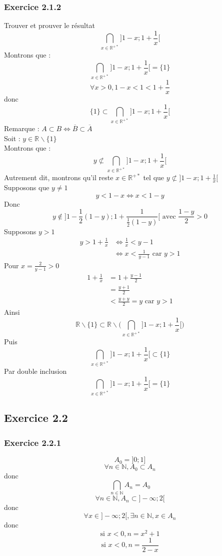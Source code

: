 \documentclass[a4paper,12pt]{article}
\begin{document}
\subsubsection*{Exercice 2.1.2}
Trouver et prouver le résultat
\[
\bigcap_{x \in \mathbb{R}^{+*}} \Big] 1-x ; 1 + \frac{1}{x} \Big[
\]
Montrons que :
\[
\bigcap_{x \in \mathbb{R}^{+*}} \Big] 1-x ; 1 + \frac{1}{x} \Big[ = \{1\}
\]
\[
\forall x > 0, 1 - x < 1 < 1 + \frac{1}{x}
\]
donc 
\[
\{1\} \subset \bigcap_{x \in \mathbb{R}^{+*}} \Big] 1-x ; 1 + \frac{1}{x} \Big[
\]
Remarque : $A \subset B \Leftrightarrow \overline{B} \subset \overline{A}$\\
Soit : $y \in \mathbb{R} \backslash \{1\}$ \\
Montrons que :
\[
y \not\subset \bigcap_{x \in \mathbb{R}^{+*}} \Big] 1-x ; 1 + \frac{1}{x} \Big[
\]
Autrement dit, montrons qu'il reste $x \in \mathbb{R}^{+*}$ tel que $y \not\subset ] 1-x ; 1 + \frac{1}{x} [$\\
Supposons que $y \not= 1$
\[
y < 1 - x \Leftrightarrow x < 1 - y 
\]
Donc
\[
y \not\in \Big] 1 - \frac{1}{2} (1 - y) ; 1 + \frac{1}{\frac{1}{2} (1-y)} \Big[ \text{ avec } \frac{1 - y}{2} > 0
\]
Supposons $y > 1$
\[
\begin{aligned}
y > 1 + \frac{1}{x} &\Leftrightarrow \frac{1}{x} < y - 1\\
& \Leftrightarrow x < \frac{1}{y-1} \text{ car } y > 1
\end{aligned}
\]
Pour $x = \frac{2}{y - 1} > 0$
\[
\begin{aligned}
1 + \frac{1}{x} &= 1 + \frac{y-1}{2}\\
&= \frac{y + 1}{2}\\
&< \frac{y + y}{2} = y \text{ car } y > 1 
\end{aligned}
\]
Ainsi $$\mathbb{R}\backslash \{1\} \subset \mathbb{R}\backslash \Big(\bigcap_{x \in \mathbb{R}^{+*}} \Big] 1-x ; 1 + \frac{1}{x} \Big[\Big)$$ Puis $$ \bigcap_{x \in \mathbb{R}^{+*}} \Big] 1-x ; 1 + \frac{1}{x} \Big[ \subset \{1\}$$
Par double inclusion $$\bigcap_{x \in \mathbb{R}^{+*}} \Big] 1-x ; 1 + \frac{1}{x} \Big[ = \{1\}$$
\subsection{Exercice 2.2}
\subsubsection{Exercice 2.2.1}
$$A_0 = ] 0 ; 1 ]$$
$$\forall n \in \mathbb{N}, A_0 \subset A_n$$
donc 
$$\bigcap_{n\in\mathbb{N}} A_n = A_0$$
$$\forall n \in \mathbb{N}, A_n \subset ] -\infty ; 2 [$$
donc 
$$\forall x \in ] -\infty ; 2 [, \exists n \in \mathbb{N}, x \in A_n $$
donc 
$$ \text{si } x < 0, n = x^2 + 1$$
$$ \text{si } x < 0, n = \frac{1}{2-x}$$
\end{document}
